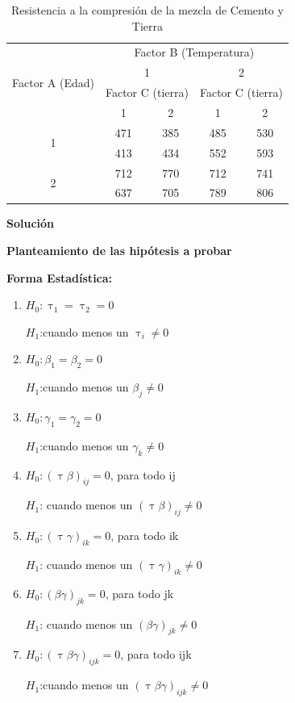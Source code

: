 \documentclass[12pt,letterpaper]{report}
\begin{document}
\begin{table}[htb]
\centering
\begin{tabular}{||c|c|c|c|c||}
\hline
\hline
\multirow{4}{*}{Factor A (Edad)} & \multicolumn{4}{c||}{Factor B (Temperatura)} \\
\cline{2-5}
                    & \multicolumn{2}{c|}{1} & \multicolumn{2}{c||}{2} \\
\cline{2-5}
                    & \multicolumn{2}{c|}{Factor C (tierra)} & \multicolumn{2}{c||}{Factor C (tierra)}\\
\cline{2-5}

                   & 1 & 2 & 1 & 2 \\
\hline
\multirow{2}{*}{1} &471&385&485&530 \\
                   &413&434&552&593 \\
\hline
\multirow{2}{*}{2} &712&770&712&741 \\
                   &637&705&789&806 \\
\hline
\hline

\end{tabular}
\caption{Resistencia a la compresión de la mezcla de Cemento y Tierra}
\end{table}

\textbf{Solución}

\textbf{Planteamiento de las hipótesis a probar}

\textbf{Forma Estadística:}
\begin{enumerate}
  \item $H_0: \uptau_1 = \uptau_2 = 0$
  
        $H_1$:cuando menos un $\uptau_i \not= 0$                     
  \item $H_0:\beta_1 = \beta_2 = 0$ 
  
        $H_1$:cuando menos un $\beta_j \not= 0$                                   
  \item $H_0: \gamma_1 = \gamma_2 =0$  
  
        $H_1$:cuando menos un $\gamma_k \not= 0$                       
  \item $H_0: (\uptau\beta)_{ij} = 0$, para todo ij   
  
        $H_1$: cuando menos un $(\uptau\beta)_{ij} \not= 0$                   
  \item $H_0: (\uptau\gamma)_{ik} = 0$, para todo ik
  
        $H_1$: cuando menos un $(\uptau\gamma)_{ik} \not= 0$
  \item $H_0: (\beta\gamma)_{jk} = 0$, para todo jk
  
        $H_1$: cuando menos un $(\beta\gamma)_{jk} \not= 0$
  \item $H_0: (\uptau\beta\gamma)_{ijk} = 0$, para todo ijk
  
        $H_1$:cuando menos un  $(\uptau\beta\gamma)_{ijk} \not= 0$
\end{enumerate}
\end{document}
